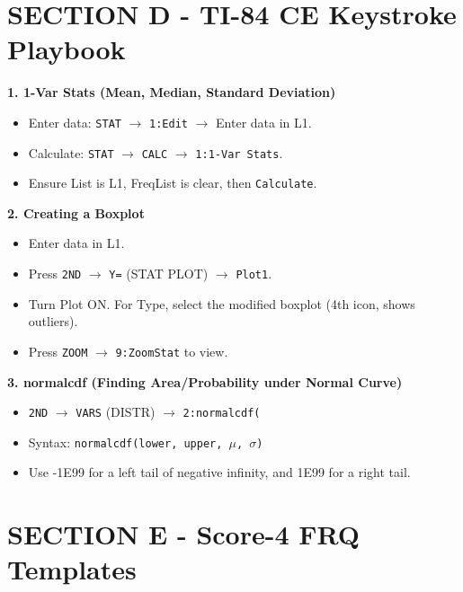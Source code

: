 \section{SECTION D - TI-84 CE Keystroke Playbook}
\begin{calculatorbox}
\textbf{1. 1-Var Stats (Mean, Median, Standard Deviation)}
\begin{itemize}
    \item Enter data: \texttt{STAT} $\rightarrow$ \texttt{1:Edit} $\rightarrow$ Enter data in L1.
    \item Calculate: \texttt{STAT} $\rightarrow$ \texttt{CALC} $\rightarrow$ \texttt{1:1-Var Stats}.
    \item Ensure List is L1, FreqList is clear, then \texttt{Calculate}.
\end{itemize}

\textbf{2. Creating a Boxplot}
\begin{itemize}
    \item Enter data in L1.
    \item Press \texttt{2ND} $\rightarrow$ \texttt{Y=} (STAT PLOT) $\rightarrow$ \texttt{Plot1}.
    \item Turn Plot ON. For Type, select the modified boxplot (4th icon, shows outliers).
    \item Press \texttt{ZOOM} $\rightarrow$ \texttt{9:ZoomStat} to view.
\end{itemize}

\textbf{3. normalcdf (Finding Area/Probability under Normal Curve)}
\begin{itemize}
    \item \texttt{2ND} $\rightarrow$ \texttt{VARS} (DISTR) $\rightarrow$ \texttt{2:normalcdf(}
    \item Syntax: \texttt{normalcdf(lower, upper, $\mu$, $\sigma$)}
    \item Use -1E99 for a left tail of negative infinity, and 1E99 for a right tail.
\end{itemize}
\end{calculatorbox}

\section{SECTION E - Score-4 FRQ Templates}

